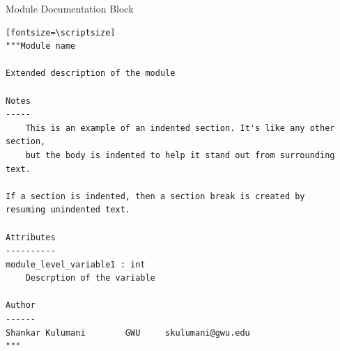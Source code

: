 \documentclass[11pt,professionalfonts]{beamer}
\begin{document}
\begin{frame}[fragile]{Module Documentation Block}
    \begin{verbatim}[fontsize=\scriptsize]
"""Module name

Extended description of the module

Notes
-----
    This is an example of an indented section. It's like any other section,
    but the body is indented to help it stand out from surrounding text.

If a section is indented, then a section break is created by
resuming unindented text.

Attributes
----------
module_level_variable1 : int
    Descrption of the variable

Author
------
Shankar Kulumani		GWU		skulumani@gwu.edu
"""
    \end{verbatim}
\end{frame}
\end{document}
